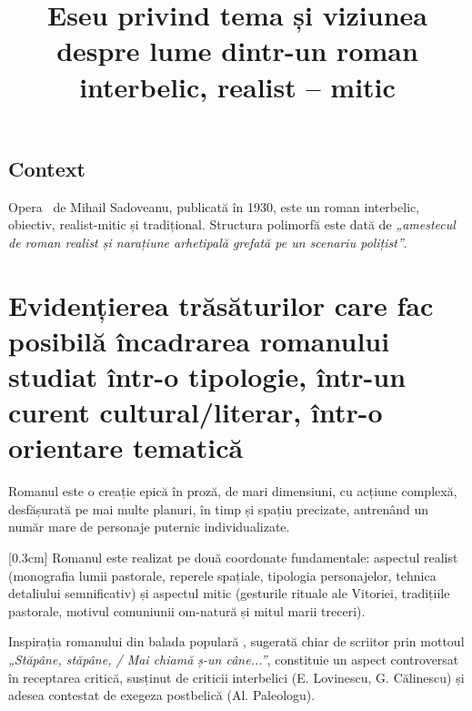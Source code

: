 

\newcommand{\operatitle}{\textbfit{„Baltagul”}} %
\newcommand{\operaauthor}{Mihail Sadoveanu} %

\title{Eseu privind tema și viziunea despre lume dintr-un roman interbelic, realist -- mitic}



\maketitle %



\subsection{Context}

Opera \operatitle\ de \operaauthor, publicată în 1930, este un roman interbelic, obiectiv, realist-mitic și tradițional. Structura polimorfă este dată de \textit{„amestecul de roman realist și narațiune arhetipală grefată pe un scenariu polițist”}.


\section{Evidențierea trăsăturilor care fac posibilă încadrarea romanului studiat într-o tipologie, într-un curent cultural/literar, într-o orientare tematică}

Romanul este o creație epică în proză, de mari dimensiuni, cu acțiune complexă, desfășurată pe mai multe planuri, în timp și spațiu precizate, antrenând un număr mare de personaje puternic individualizate.

[0.3cm]
Romanul este realizat pe două coordonate fundamentale: aspectul realist (monografia lumii pastorale, reperele spațiale, tipologia personajelor, tehnica detaliului semnificativ) și aspectul mitic (gesturile rituale ale Vitoriei, tradițiile pastorale, motivul comuniunii om-natură și mitul marii treceri).

Inspirația romanului din balada populară , sugerată chiar de scriitor prin mottoul \textit{„Stăpâne, stăpâne, / Mai chiamă ș-un câne...”}, constituie un aspect controversat în receptarea critică, susținut de criticii interbelici (E. Lovinescu, G. Călinescu) și adesea contestat de exegeza postbelică (Al. Paleologu).


